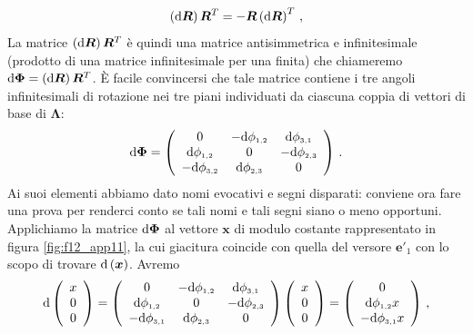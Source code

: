 \vskip 1mm
\begin{equation}
\left({\rm d}\bm{R}\right)\bm{R}^T=
-\bm{R}\left({\rm d}\bm{R}\right)^T\,,
\label{e110_app11}
\end{equation}
\noindent La matrice $\left({\rm d}\bm{R}\right)\bm{R}^T$ \`e quindi una matrice
antisimmetrica e infinitesimale (prodotto di una matrice infinitesimale
per una finita) che chiameremo 
${\rm d}\bm{\Phi}=\left({\rm d}\bm{R}\right)\bm{R}^T$. \`E facile convincersi che tale matrice
contiene i tre angoli infinitesimali
di rotazione nei tre piani individuati da ciascuna coppia di vettori di base di
$\bm \Lambda$: 
\begin{equation}
{\rm d}{\bm\Phi}=\left( \begin{array}{ccc}
0 & -{\rm d}\phi_{{\scriptscriptstyle{1,2}}} & {\rm d}\phi_{{\scriptscriptstyle{3,1}}}\\
{\rm d}\phi_{{\scriptscriptstyle{1,2}}} & 0 & -{\rm d}\phi_{{\scriptscriptstyle{2,3}}}\\
-{\rm d}\phi_{{\scriptscriptstyle{3,2}}} & {\rm d}\phi_{{\scriptscriptstyle{2,3}}} & 0\\
\end{array}
\right)
\,.
\label{e111_app11}
\end{equation}
\noindent Ai suoi elementi abbiamo dato nomi evocativi e segni disparati: conviene
ora fare una prova per renderci conto se tali nomi e tali segni siano o meno
opportuni.
Applichiamo la matrice ${\rm d}\bm \Phi$ al vettore $\bm x$ di modulo costante rappresentato
in figura \ref{fig:f12_app11}, la cui giacitura coincide con quella del
versore $\bm{e'}_1$ con lo scopo di trovare ${\rm d}\left(\bm{x}\right)$.
Avremo
\begin{equation}
{\rm d}
 \left( \begin{array}{c}
x \\ 
0 \\ 
0 \\
\end{array}
\right)=
\left( \begin{array}{ccc}
0 & -{\rm d}\phi_{{\scriptscriptstyle{1,2}}} & {\rm d}\phi_{{\scriptscriptstyle{3,1}}}\\
{\rm d}\phi_{{\scriptscriptstyle{1,2}}} & 0 & -{\rm d}\phi_{{\scriptscriptstyle{2,3}}}\\
-{\rm d}\phi_{{\scriptscriptstyle{3,1}}} & {\rm d}\phi_{{\scriptscriptstyle{2,3}}} & 0\\
\end{array}
\right)
 \left( \begin{array}{c}
x \\ 
0 \\ 
0 \\
\end{array}
\right)=
 \left( \begin{array}{c}
0 \\
{\rm d}\phi_{{\scriptscriptstyle{1,2}}}x \\
-{\rm d}\phi_{{\scriptscriptstyle{3,1}}}x \\
\end{array}
\right)
\,,
\label{e112_app11}
\end{equation}
